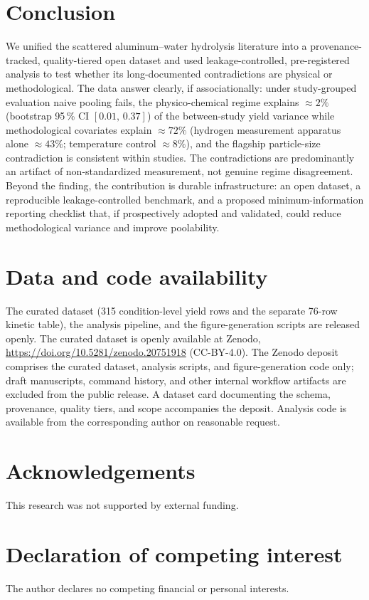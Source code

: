 \section{Conclusion}
We unified the scattered aluminum--water hydrolysis literature into a provenance-tracked,
quality-tiered open dataset and used leakage-controlled, pre-registered analysis to test
whether its long-documented contradictions are physical or methodological. The data answer
clearly, if associationally: under study-grouped evaluation naive pooling fails, the
physico-chemical regime explains $\approx\!2\%$ (bootstrap 95\,\% CI $[0.01,\,0.37]$) of the between-study yield variance while
methodological covariates explain $\approx\!72\%$ (hydrogen measurement apparatus alone $\approx\!43\%$;
temperature control $\approx\!8\%$),
and the flagship particle-size contradiction is consistent within studies. The contradictions
are predominantly an artifact of non-standardized measurement, not genuine regime
disagreement. Beyond the finding, the contribution is durable infrastructure: an open
dataset, a reproducible leakage-controlled benchmark, and a proposed minimum-information
reporting checklist that, if prospectively adopted and validated, could reduce methodological
variance and improve poolability.

\section*{Data and code availability}
The curated dataset (315 condition-level yield rows and the separate 76-row kinetic table), the
analysis pipeline, and the figure-generation scripts are released openly. The curated dataset is
openly available at Zenodo, \url{https://doi.org/10.5281/zenodo.20751918} (CC-BY-4.0). The Zenodo
deposit comprises the curated dataset, analysis scripts, and figure-generation code only; draft
manuscripts, command history, and other internal workflow artifacts are excluded from the public
release. A dataset card documenting the schema, provenance, quality tiers, and scope accompanies
the deposit. Analysis code is available from the corresponding author on reasonable request.

\section*{Acknowledgements}
This research was not supported by external funding.

\section*{Declaration of competing interest}
The author declares no competing financial or personal interests.


